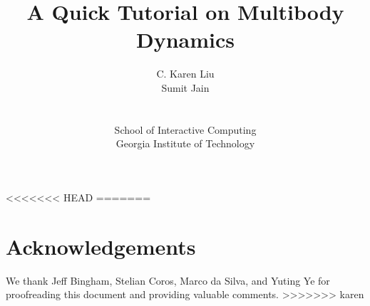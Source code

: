 \documentclass[12pt, letterpaper, onecolumn]{article}
\title{A Quick Tutorial on Multibody Dynamics}
\author{{C. Karen Liu} \\
{Sumit Jain} \\ \\ \\
{School of Interactive Computing}\\
{Georgia Institute of Technology} 
}
\begin{document}
%
\date{}
\maketitle

\newpage

\tableofcontents
{}
\newpage
%

\newpage

\newpage

\newpage

\newpage

\newpage

\newpage


<<<<<<< HEAD
=======
\section*{Acknowledgements}
{
We thank Jeff Bingham, Stelian Coros, Marco da Silva, and Yuting Ye for
proofreading this document and providing valuable comments.
}
>>>>>>> karen
{
%

}
\end{document}
